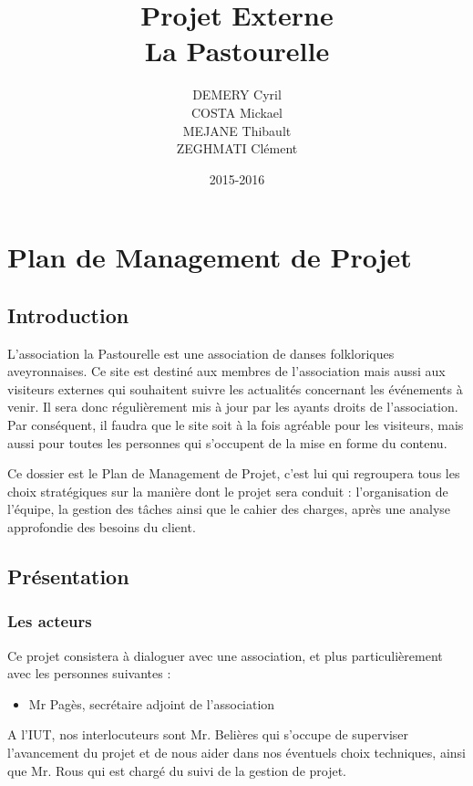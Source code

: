 \documentclass[11pt]{report}
\title{Projet Externe\\La Pastourelle}
\author{DEMERY Cyril\\COSTA Mickael\\MEJANE Thibault\\ZEGHMATI Clément}
\date{2015-2016}
\begin{document}
\maketitle
\setcounter{tocdepth}{5}
\chapter{Plan de Management de Projet}
\section{Introduction}
L’association la Pastourelle est une association de danses folkloriques 
aveyronnaises. Ce site est destiné aux membres de l’association mais aussi aux 
visiteurs externes qui souhaitent suivre les actualités concernant les 
événements à venir. Il sera donc régulièrement mis à jour par les ayants 
droits de l’association. Par conséquent, il faudra que le site soit à la fois 
agréable pour les visiteurs, mais aussi pour toutes les personnes qui 
s'occupent de la mise en forme du contenu.\\

\par Ce dossier est le Plan de Management de Projet, c'est lui qui regroupera 
tous les choix stratégiques sur la manière dont le projet sera conduit : 
l'organisation de l'équipe, la gestion des tâches ainsi que le cahier des 
charges, après une analyse approfondie des besoins du client.

\section{Présentation}
\subsection{Les acteurs}
Ce projet consistera à dialoguer avec une association, et plus particulièrement 
avec les personnes suivantes : 
\begin{itemize}
    \item Mr Pagès, secrétaire adjoint de l’association\\
\end{itemize}

\par A l'IUT, nos interlocuteurs sont Mr. Belières qui s'occupe de superviser 
l'avancement du projet et de nous aider dans nos éventuels choix techniques, 
ainsi que Mr. Rous qui est chargé du suivi de la gestion de projet.   \\
\end{document}
